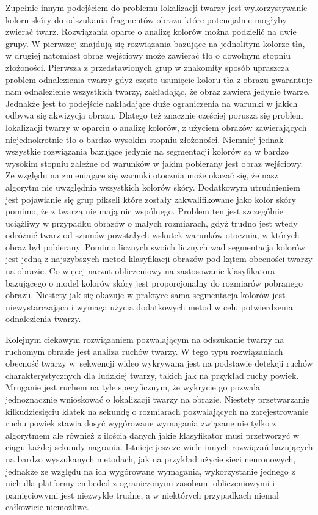 Zupełnie innym podejściem do problemu lokalizacji twarzy jest wykorzystywanie
koloru skóry do odszukania fragmentów obrazu które potencjalnie mogłyby zwierać
twarz. Rozwiązania oparte o analizę kolorów można podzielić na dwie grupy. W
pierwszej znajdują się rozwiązania bazujące na jednolitym kolorze tła, w drugiej
natomiast obraz wejściowy może zawierać tło o dowolnym stopniu złożoności.
Pierwsza z przedstawionych grup w znakomity sposób upraszcza problem odnalezienia
twarzy gdyż często usunięcie koloru tła z obrazu gwarantuje nam odnalezienie
wszystkich twarzy, zakładając, że obraz zawiera jedynie twarze. Jednakże jest to
podejście nakładające duże ograniczenia na warunki w jakich odbywa się akwizycja
obrazu. Dlatego też znacznie częściej porusza się problem lokalizacji twarzy w
oparciu o analizę kolorów, z użyciem obrazów zawierających niejednokrotnie tło o
bardzo wysokim stopniu złożoności. Niemniej jednak wszystkie rozwiązania bazujące
jedynie na segmentacji kolorów są w bardzo wysokim stopniu zależne od warunków w
jakim pobierany jest obraz wejściowy. Ze względu na zmieniające się warunki
otocznia może okazać się, że nasz algorytm nie uwzględnia wszystkich kolorów
skóry. Dodatkowym utrudnieniem jest pojawianie się grup pikseli które zostały
zakwalifikowane jako kolor skóry pomimo, że z twarzą nie mają nic wspólnego.
Problem ten jest szczególnie uciążliwy w przypadku obrazów o małych rozmiarach,
gdyż trudno jest wtedy odróżnić twarz od szumów powstałych wskutek warunków
otocznia, w których obraz był pobierany. Pomimo licznych swoich licznych wad
segmentacja kolorów jest jedną z najszybszych metod klasyfikacji obrazów pod
kątem obecności twarzy na obrazie. Co więcej narzut obliczeniowy na zastosowanie
klasyfikatora bazującego o model kolorów skóry jest proporcjonalny do rozmiarów
pobranego obrazu. Niestety jak się okazuje w praktyce sama segmentacja kolorów
jest niewystarczająca i wymaga
użycia dodatkowych metod w celu potwierdzenia odnalezienia twarzy.

Kolejnym ciekawym rozwiązaniem pozwalającym na odszukanie twarzy na ruchomym
obrazie jest analiza ruchów twarzy. W tego typu rozwiązaniach obecność twarzy
w~sekwencji wideo wykrywana jest na podstawie detekcji ruchów charakterystycznych
dla ludzkiej twarzy, takich jak na przykład ruchy powiek. Mruganie jest ruchem na
tyle specyficznym, że wykrycie go pozwala jednoznacznie wnioskować o lokalizacji
twarzy na obrazie. Niestety przetwarzanie kilkudziesięciu klatek na sekundę o
rozmiarach pozwalających na zarejestrowanie ruchu powiek stawia dosyć wygórowane
wymagania związane nie tylko z algorytmem ale również z ilością danych jakie
klasyfikator musi przetworzyć w ciągu każdej sekundy nagrania. Istnieje jeszcze
wiele innych rozwiązań bazujących na bardzo wyszukanych metodach, jak na przykład
użycie sieci neuronowych, jednakże ze względu na ich wygórowane wymagania,
wykorzystanie jednego z nich dla platformy embeded z ograniczonymi zasobami
obliczeniowymi i pamięciowymi jest niezwykle trudne, a w niektórych przypadkach
niemal całkowicie niemożliwe.

